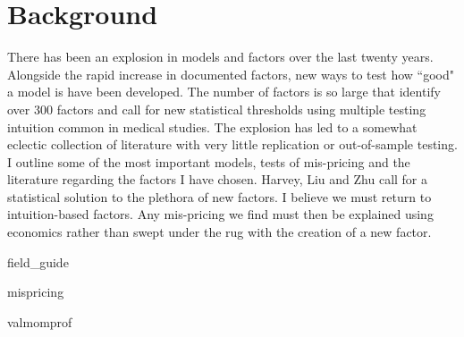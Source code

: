 
\section{Background}

There has been an explosion in models and factors over the last twenty years. Alongside
the rapid increase in documented factors, new ways to test how ``good" a model is have
been developed. The number of factors is so large that \textcite{harvey2016and} identify
over 300 factors and call for new statistical thresholds using multiple testing intuition
common in medical studies. The explosion has led to a somewhat eclectic collection of
literature with very little replication or out-of-sample testing. I outline some of the
most important models, tests of mis-pricing and the literature regarding the factors I
have chosen. Harvey, Liu and Zhu call for a statistical solution to the plethora of new
factors. I believe we must return to intuition-based factors. Any mis-pricing we find must
then be explained using economics rather than swept under the rug with the creation of a
new factor.

{field_guide}

{mispricing}

{valmomprof}

